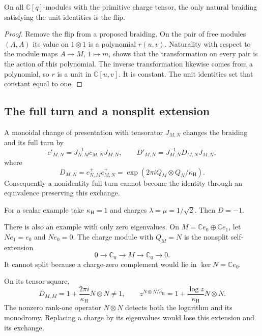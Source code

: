 \begin{proposition}\label{cyrec:prop:ambient-braiding}
On all $\mathbb C[q]$-modules with the primitive charge tensor, the
only natural braiding satisfying the unit identities is the flip.
\end{proposition}

\begin{proof}
Remove the flip from a proposed braiding. On the pair of free
modules $(A,A)$ its value on $1\otimes1$ is a polynomial
$r(u,v)$. Naturality with respect to the module maps
$A\to M$, $1\mapsto m$, shows that the transformation on every
pair is the action of this polynomial. The inverse transformation
likewise comes from a polynomial, so $r$ is a unit in
$\mathbb C[u,v]$. It is constant. The unit identities set that
constant equal to one.
\end{proof}

\subsection{The full turn and a nonsplit extension}

A monoidal change of presentation with tensorator $J_{M,N}$
changes the braiding and its full turn by
\begin{equation}\label{cyrec:eq:conjugacy}
 c'_{M,N}=J_{N,M}^{-1}c_{M,N}J_{M,N},
 \qquad
 D'_{M,N}=J_{M,N}^{-1}D_{M,N}J_{M,N},
\end{equation}
where
\[
 D_{M,N}=c^+_{N,M}c^+_{M,N}
        =\exp(2\pi iQ_M\otimes Q_N/\kappa_{\mathrm H}).
\]
Consequently a nonidentity full turn cannot become the identity
through an equivalence preserving this exchange.

For a scalar example take $\kappa_{\mathrm H}=1$ and charges
$\lambda=\mu=1/\sqrt2$. Then $D=-1$.

There is also an example with only zero eigenvalues. On
$M=\mathbb C e_0\oplus\mathbb C e_1$, let
$Ne_1=e_0$ and $Ne_0=0$. The charge module with $Q_M=N$ is the
nonsplit self-extension
\[
 0\longrightarrow\mathbb C_0\longrightarrow M
                     \longrightarrow\mathbb C_0\longrightarrow0.
\]
It cannot split because a charge-zero complement would lie in
$\ker N=\mathbb C e_0$.

On its tensor square,
\begin{equation}\label{cyrec:eq:nilpotent-turn}
 D_{M,M}=1+\frac{2\pi i}{\kappa_{\mathrm H}}N\otimes N\ne1,
 \qquad
 z^{N\otimes N/\kappa_{\mathrm H}}
 =1+\frac{\log z}{\kappa_{\mathrm H}}N\otimes N.
\end{equation}
The nonzero rank-one operator $N\otimes N$ detects both the
logarithm and its monodromy. Replacing a charge by its eigenvalues
would lose this extension and its exchange.

